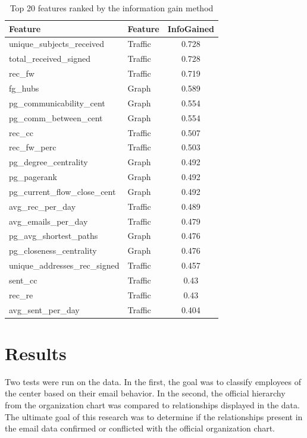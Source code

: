 \documentclass{article}
\begin{document}
\begin{table}[H]
\centering
\caption{Top 20 features ranked by the information gain method}
\label{tab:ranked_feats}
\begin{tabular}{|l|l|c|}
\hline
Feature                                & Feature      & InfoGained \\\hline
unique\_subjects\_received             & Traffic      & 0.728  \\
total\_received\_signed                & Traffic      & 0.728  \\
rec\_fw                                & Traffic      & 0.719  \\
fg\_hubs                               & Graph        & 0.589  \\
pg\_communicability\_cent              & Graph        & 0.554  \\
pg\_comm\_between\_cent                & Graph        & 0.554  \\
rec\_cc                                & Traffic      & 0.507  \\
rec\_fw\_perc                          & Traffic      & 0.503  \\
pg\_degree\_centrality                 & Graph        & 0.492  \\
pg\_pagerank                           & Graph        & 0.492  \\
pg\_current\_flow\_close\_cent         & Graph        & 0.492  \\
avg\_rec\_per\_day                     & Traffic      & 0.489  \\
avg\_emails\_per\_day                  & Traffic      & 0.479  \\
pg\_avg\_shortest\_paths               & Graph        & 0.476  \\
pg\_closeness\_centrality              & Graph        & 0.476  \\
unique\_addresses\_rec\_signed         & Traffic      & 0.457  \\
sent\_cc                               & Traffic      & 0.43   \\
rec\_re                                & Traffic      & 0.43   \\
avg\_sent\_per\_day                    & Traffic      & 0.404  \\ \hline
\end{tabular}
\end{table}


\section{Results} \label{Results}
Two tests were run on the data.  In the first, the goal was to classify employees of the center based on their email behavior.  In the second, the official hierarchy from the organization chart was compared to relationships displayed in the data.  The ultimate goal of this research was to determine if the relationships present in the email data confirmed or conflicted with the official organization chart.
\end{document}
